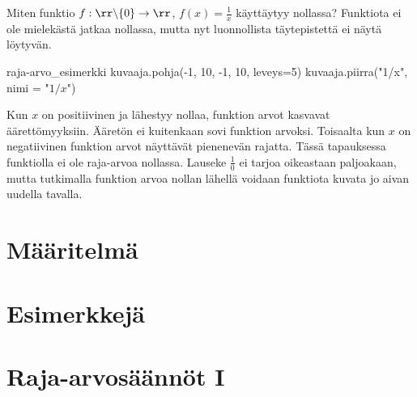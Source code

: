 Miten funktio  $f: \rr \backslash \{0 \} \to \rr$, $f(x) = \frac{1}{x}$ käyttäytyy nollassa? Funktiota ei ole mielekästä jatkaa nollassa, mutta nyt luonnollista täytepistettä ei näytä löytyvän.

\begin{luoKuva}{raja-arvo_esimerkki}
    kuvaaja.pohja(-1, 10, -1, 10, leveys=5)
    kuvaaja.piirra("1/x", nimi = "$1/x$")
\end{luoKuva}

\begin{center}
\end{center}

Kun $x$ on positiivinen ja lähestyy nollaa, funktion arvot kasvavat äärettömyyksiin. Ääretön ei kuitenkaan sovi funktion arvoksi. Toisaalta kun $x$ on negatiivinen funktion arvot näyttävät pienenevän rajatta. Tässä tapauksessa funktiolla ei ole raja-arvoa nollassa. Lauseke $\frac{1}{0}$ ei tarjoa oikeastaan paljoakaan, mutta tutkimalla funktion arvoa nollan lähellä voidaan funktiota kuvata jo aivan uudella tavalla.

\section{Määritelmä}


\section{Esimerkkejä}


\section{Raja-arvosäännöt I}


